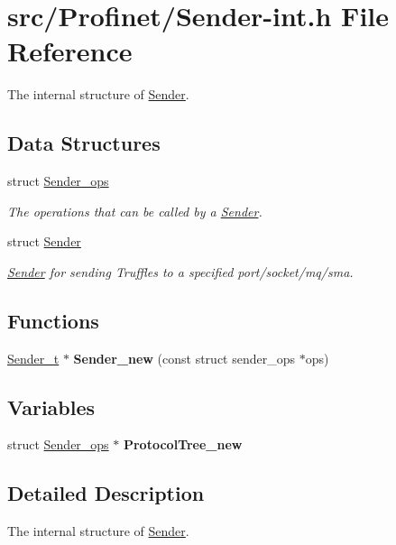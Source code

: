 \hypertarget{_sender-int_8h}{\section{src/\-Profinet/\-Sender-\/int.h File Reference}
\label{_sender-int_8h}
}


The internal structure of \hyperlink{struct_sender}{Sender}.  


\subsection*{Data Structures}
\begin{DoxyCompactItemize}
\item 
struct \hyperlink{struct_sender__ops}{Sender\-\_\-ops}
\begin{DoxyCompactList}\small\item\em The operations that can be called by a \hyperlink{struct_sender}{Sender}. \end{DoxyCompactList}\item 
struct \hyperlink{struct_sender}{Sender}
\begin{DoxyCompactList}\small\item\em \hyperlink{struct_sender}{Sender} for sending Truffles to a specified port/socket/mq/sma. \end{DoxyCompactList}\end{DoxyCompactItemize}
\subsection*{Functions}
\begin{DoxyCompactItemize}
\item 
\hypertarget{_sender-int_8h_a8fd47a704efa4b163bce4835be401bd9}{\hyperlink{struct_sender}{Sender\-\_\-t} $\ast$ {\bfseries Sender\-\_\-new} (const struct sender\-\_\-ops $\ast$ops)}\label{_sender-int_8h_a8fd47a704efa4b163bce4835be401bd9}

\end{DoxyCompactItemize}
\subsection*{Variables}
\begin{DoxyCompactItemize}
\item 
\hypertarget{_sender-int_8h_aeda9b8cd79a841683977a04b7e28c195}{struct \hyperlink{struct_sender__ops}{Sender\-\_\-ops} $\ast$ {\bfseries Protocol\-Tree\-\_\-new}}\label{_sender-int_8h_aeda9b8cd79a841683977a04b7e28c195}

\end{DoxyCompactItemize}


\subsection{Detailed Description}
The internal structure of \hyperlink{struct_sender}{Sender}. 